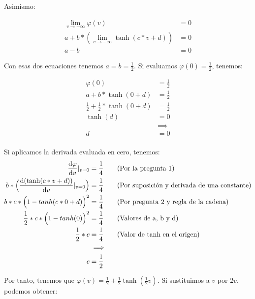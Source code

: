 \documentclass[11pt,spanish,answers]{exam}
\begin{document}
\begin{questions}
\begin{solution}
    Asimismo:
    
    \begin{align*}
        \lim_{v \to -\infty} \varphi(v) &= 0 \tag*{(Límite de la logística al tender al infinito negativo)}\\
        a + b*(\lim_{v \to -\infty} \tanh(c*v+d)) &= 0 \tag*{(Sustituyendo la suposición y aplicando límite)}\\
        a - b &= 0 \tag*{(Límite de tanh al tender al infinito negativo)}
    \end{align*}
    
    Con esas dos ecuaciones tenemos $a = b = \frac{1}{2}$. Si evaluamos $\varphi(0)=\frac{1}{2}$, tenemos:
    
    \begin{align*}
        \varphi(0) &= \frac{1}{2} \tag*{(Valor de la logística)} \\
        a + b*\tanh(0 + d) &= \frac{1}{2} \tag*{(Suposición)} \\
        \frac{1}{2} + \frac{1}{2}*\tanh(0 + d) &= \frac{1}{2} \tag*{(Valores de a y b)} \\
        \tanh(d) &= 0 \tag*{(Simplificando)} \\
        &\implies \\
        d &= 0 \tag*{(Valor de tanh en el origen)} \\
    \end{align*}
    
    Si aplicamos la derivada evaluada en cero, tenemos:
    \begin{align*}
        \dv{\varphi}{v} |_{v=0} &= \frac{1}{4} \tag*{(Por la pregunta 1)} \\
        b*\Big(\dv{(\tanh(c*v+d))}{v} |_{v=0}\Big) &= \frac{1}{4} \tag*{(Por suposición y derivada de una constante)} \\
        b*c*\Big(1-tanh(c*0 + d)\Big)^2 &= \frac{1}{4} \tag*{(Por pregunta 2 y regla de la cadena)} \\
        \frac{1}{2}*c*\Big(1-tanh(0)\Big)^2 &= \frac{1}{4} \tag*{(Valores de a, b y d)} \\
        \frac{1}{2}*c &= \frac{1}{4} \tag*{(Valor de tanh en el origen)} \\
        &\implies \\
        c &= \frac{1}{2} \\
    \end{align*}
    
    Por tanto, tenemos que $\varphi(v) = \frac{1}{2} + \frac{1}{2}\tanh(\frac{1}{2}v)$. Si sustituimos a $v$ por $2v$, podemos obtener:
    

\end{solution}
\end{questions}
\end{document}
